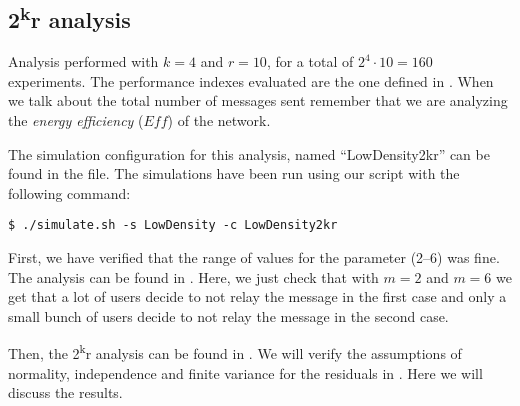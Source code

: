 \subsection{2\texorpdfstring{\textsuperscript{k}}{k}r analysis}\label{subsec:ld2kr}

Analysis performed with \(k\!=\!4\) and \(r\!=\!10\), for a total of \(2^4 \cdot
10 \!=\!160\) experiments. The performance indexes evaluated are the one defined
in . When we talk about the total number of messages sent
remember that we are analyzing the \emph{energy efficiency} (\(\mathit{Eff}\))
of the network.

The simulation configuration for this analysis, named ``LowDensity2kr'' can be
found in the  file. The simulations have been run using
our  script with the following command:
\begin{verbatim}
$ ./simulate.sh -s LowDensity -c LowDensity2kr
\end{verbatim}

First, we have verified that the range of values for the 
parameter (2--6) was fine. The analysis can be found in .
Here, we just check that with \(m\!=\!2\) and \(m\!=\!6\) we get that a lot of
users decide to not relay the message in the first case and only a small bunch
of users decide to not relay the message in the second case.

Then, the 2\textsuperscript{k}r analysis can be found in . We
will verify the assumptions of normality, independence and finite variance for
the residuals in . Here we will discuss the
results.





